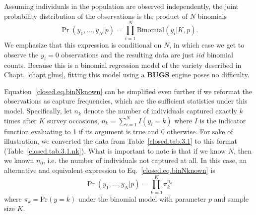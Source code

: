 Assuming individuals in the population are observed independently, the
joint probability distribution of the observations is the product of
$N$ binomials
\begin{equation}
  \Pr(y_1, \ldots, y_N | p) = \prod_{i=1}^N  \mathrm{Binomial}(y_i | K, p).
  \label{closed.eq.binNknown}
\end{equation}
We emphasize that this expression is conditional on $N$, in which
case we get to observe the $y_i=0$ observations and the resulting data
are just $iid$ binomial counts. Because this is a binomial regression
model of the variety described in Chapt. \ref{chapt.glms}, fitting this model using
a {\bf BUGS} engine poses no difficulty.

Equation~\ref{closed.eq.binNknown} can be simplified even further if we reformat the
observations as capture frequencies, which are the sufficient
statistics under this model. Specifically, let $n_k$ denote the number
of individuals captured exactly $k$ times after $K$ survey occasions, $n_k = \sum_{i=1}^N
I(y_i = k)$ where $I$ is the indicator function evaluating to 1 if its
argument is true and 0 otherwise. For sake of illustration,
we converted the data from Table~\ref{closed.tab.3.1} to this
format (Table~\ref{closed.tab.3.1.nk}). What is important to note is
that if we know $N$, then we known $n_0$, i.e. the number of
individuals not captured at all. In this case, an alternative and equivalent expression to
Eq.~\ref{closed.eq.binNknown} is
\begin{equation}
  \Pr(y_1, \ldots, y_N | p) = \prod_{k=0}^K  \pi_{k}^{n_k}
  \label{closed.eq.multiNknown}
\end{equation}
where $\pi_{k} = \mathrm{Pr}(y=k)$ under the binomial model with
parameter $p$ and sample size $K$. 

